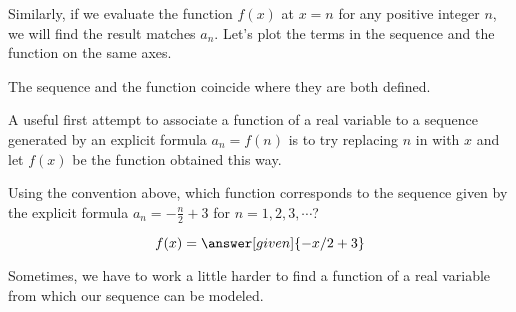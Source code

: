 \documentclass{ximera}
\begin{document}
Similarly, if we evaluate the function $f(x)$ at $x=n$ for any positive integer $n$, we will find the result matches $a_n$.  Let's plot the terms in the sequence and the function on the same axes.

\begin{image}
\end{image}

The sequence and the function coincide where they are both defined.  

A useful first attempt to associate a function of a real variable to a sequence generated by an explicit formula $a_n=f(n)$ is to try replacing $n$ in  with $x$ and let $f(x)$ be the function obtained this way.

\begin{question}
  Using the convention above, which function corresponds to the sequence given by the explicit formula
  $a_n = -\frac{n}{2}+3$ for $n=1,2,3,\cdots$?
  \begin{prompt}
    \[
    f(x) = \answer[given]{-x/2 + 3}
    \]
  \end{prompt}
\end{question}

Sometimes, we have to work a little harder to find a function of a real variable from which our sequence can be modeled.  
\end{document}
